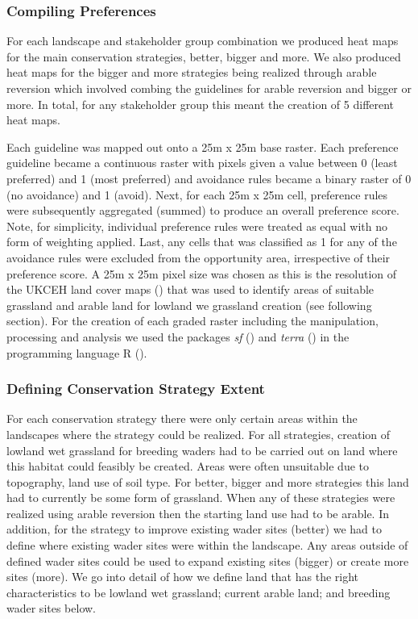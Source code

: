 \documentclass[
  12pt,
  letterpaper,
  DIV=11,
  numbers=noendperiod]{scrartcl}
\begin{document}
\subsubsection{Compiling Preferences}\label{compiling-preferences}

For each landscape and stakeholder group combination we produced heat
maps for the main conservation strategies, better, bigger and more. We
also produced heat maps for the bigger and more strategies being
realized through arable reversion which involved combing the guidelines
for arable reversion and bigger or more. In total, for any stakeholder
group this meant the creation of 5 different heat maps.

Each guideline was mapped out onto a 25m x 25m base raster. Each
preference guideline became a continuous raster with pixels given a
value between 0 (least preferred) and 1 (most preferred) and avoidance
rules became a binary raster of 0 (no avoidance) and 1 (avoid). Next,
for each 25m x 25m cell, preference rules were subsequently aggregated
(summed) to produce an overall preference score. Note, for simplicity,
individual preference rules were treated as equal with no form of
weighting applied. Last, any cells that was classified as 1 for any of
the avoidance rules were excluded from the opportunity area,
irrespective of their preference score. A 25m x 25m pixel size was
chosen as this is the resolution of the UKCEH land cover maps
() that was used to
identify areas of suitable grassland and arable land for lowland we
grassland creation (see following section). For the creation of each
graded raster including the manipulation, processing and analysis we
used the packages \emph{sf} ()
and \emph{terra} () in the
programming language R ().

\subsubsection{Defining Conservation Strategy
Extent}\label{defining-conservation-strategy-extent}

For each conservation strategy there were only certain areas within the
landscapes where the strategy could be realized. For all strategies,
creation of lowland wet grassland for breeding waders had to be carried
out on land where this habitat could feasibly be created. Areas were
often unsuitable due to topography, land use of soil type. For better,
bigger and more strategies this land had to currently be some form of
grassland. When any of these strategies were realized using arable
reversion then the starting land use had to be arable. In addition, for
the strategy to improve existing wader sites (better) we had to define
where existing wader sites were within the landscape. Any areas outside
of defined wader sites could be used to expand existing sites (bigger)
or create more sites (more). We go into detail of how we define land
that has the right characteristics to be lowland wet grassland; current
arable land; and breeding wader sites below.
\end{document}
